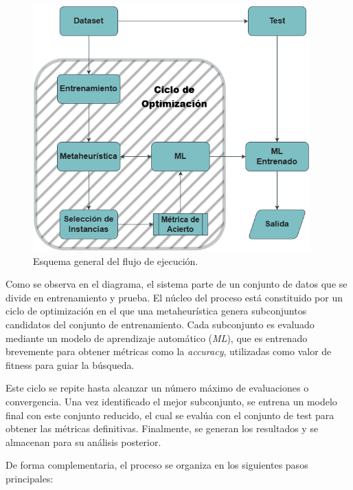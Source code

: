 \begin{figure}[ht]
      \centering
      \includegraphics[width=0.95\textwidth]{imagenes/TFG.drawio.png}
      \caption{Esquema general del flujo de ejecución.}
      \label{fig:esquema-flujo-algoritmos}
\end{figure}

Como se observa en el diagrama, el sistema parte de un conjunto de datos que se divide en entrenamiento y prueba.
El núcleo del proceso está constituido por un ciclo de optimización en el que una metaheurística genera subconjuntos candidatos del conjunto de entrenamiento.
Cada subconjunto es evaluado mediante un modelo de aprendizaje automático (\textit{ML}),
que es entrenado brevemente para obtener métricas como la \textit{accuracy}, utilizadas como valor de fitness para guiar la búsqueda.

Este ciclo se repite hasta alcanzar un número máximo de evaluaciones o convergencia.
Una vez identificado el mejor subconjunto, se entrena un modelo final con este conjunto reducido,
el cual se evalúa con el conjunto de test para obtener las métricas definitivas.
Finalmente, se generan los resultados y se almacenan para su análisis posterior.

De forma complementaria, el proceso se organiza en los siguientes pasos principales:

